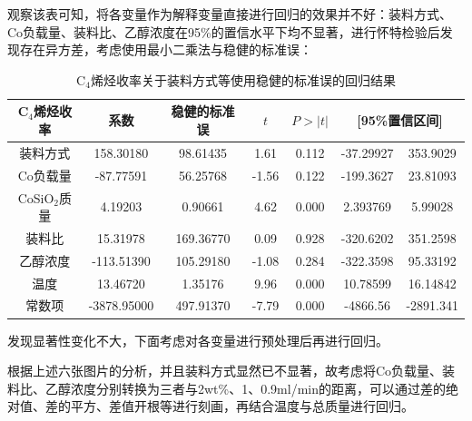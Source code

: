 \documentclass[a4paper,10.5pt]{ctexart}
\begin{document}
观察该表可知，将各变量作为解释变量直接进行回归的效果并不好：装料方式、Co负载量、装料比、乙醇浓度在95\%的置信水平下均不显著，进行怀特检验后发现存在异方差，考虑使用最小二乘法与稳健的标准误\cite{article2}：
\begin{table}[htbp]
  \centering
  \caption{C$_4$烯烃收率关于装料方式等使用稳健的标准误的回归结果}
    \begin{tabular}{ccccccc}
    \toprule[2pt]
    C$_4$烯烃收率 & 系数    & 稳健的标准误 & $t$ & $P>|t|$ & \multicolumn{2}{p{10.225em}}{[95\%置信区间]} \\
    \midrule
    装料方式  & 158.30180  & 98.61435  & 1.61  & 0.112 & -37.29927 & 353.9029 \\
    Co负载量 & -87.77591  & 56.25768  & -1.56 & 0.122 & -199.3627 & 23.81093 \\
    CoSiO$_2$质量 & 4.19203  & 0.90661  & 4.62  & 0.000 & 2.393769 & 5.99028 \\
    装料比   & 15.31978  & 169.36770  & 0.09  & 0.928 & -320.6202 & 351.2598 \\
    乙醇浓度  & -113.51390  & 105.29180  & -1.08 & 0.284 & -322.3598 & 95.33192 \\
    温度    & 13.46720  & 1.35176  & 9.96  & 0.000 & 10.78599 & 16.14842 \\
    常数项   & -3878.95000  & 497.91370  & -7.79 & 0.000 & -4866.56 & -2891.341 \\
    \bottomrule[2pt]
    \end{tabular}%
  \label{tab:addlabel}%
\end{table}%

发现显著性变化不大，下面考虑对各变量进行预处理后再进行回归。

根据上述六张图片的分析，并且装料方式显然已不显著，故考虑将Co负载量、装料比、乙醇浓度分别转换为三者与2wt\%、1、0.9ml/min的距离，可以通过差的绝对值、差的平方、差值开根等进行刻画，再结合温度与总质量进行回归。
\end{document}

